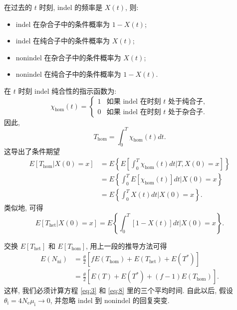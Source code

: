 \documentclass[12pt]{article}
\begin{document}
在过去的 $t$ 时刻, indel 的频率是 $X(t)$, 则:
\begin{itemize}[leftmargin=4em]
    \item indel 在杂合子中的条件概率为 $1-X(t)$;
    \item indel 在纯合子中的条件概率为 $X(t)$;
    \item nonindel 在杂合子中的条件概率为 $X(t)$;
    \item nonindel 在纯合子中的条件概率为 $1-X(t)$.
\end{itemize}
在 $t$ 时刻 indel 纯合性的指示函数为:
\begin{equation} \label{eq:4}
    \chi_\text{hom}(t) =
    {\begin{cases}
        1 & \text{如果 indel 在时刻~} t \text{~处于纯合子}, \\
        0 & \text{如果 indel 在时刻~} t \text{~处于杂合子}.
        \end{cases}}
\end{equation}
因此,
\begin{equation} \label{eq:5}
    T_\text{hom} = \int_{0}^{T} \chi_\text{hom}(t)dt \text{.}
\end{equation}
这导出了条件期望
\begin{equation} \label{eq:6}
    \begin{split}
        E[T_\text{hom} | X(0)=x]
        &= E \left\{ E\left[ \int_{0}^{T} \chi_\text{hom}(t) dt \mathrel{\Big|} T, X(0)=x  \right] \right\} \\
        &= E \left\{ \int_{0}^{T} E[\chi_\text{hom}(t)] dt \mathrel{\Big|} X(0)=x \right\} \\
        &= E \left\{ \int_{0}^{T} X(t) dt \mathrel{\Big|} X(0)=x \right\}
        \text{.}
    \end{split}
\end{equation}
类似地, 可得
\begin{equation} \label{eq:7}
    E[T_\text{het} | X(0)=x] = E \left\{ \int_{0}^{T} [1-X(t)] dt \mathrel{\Big|} X(0)=x \right\}
    \text{.}
\end{equation}

交换 $E[T_\text{het}]$ 和 $E[T_\text{hom}]$, 用上一段的推导方法可得
\begin{equation} \label{eq:8}
    \begin{split}
        E(N_\text{ni})
        &= \frac{\theta}{2} [f E(T_{\text{hom}}) + E(T_{\text{het}}) + E(T^*)] \\
        &= \frac{\theta}{2} [E(T) + E(T^*) + (f - 1) E(T_{\text{hom}})]
        \text{.}
    \end{split}
\end{equation}
这样, 我们必须计算方程 \ref{eq:3} 和 \ref{eq:8} 里的三个平均时间.
自此以后, 假设 $\theta_\text{i} = 4N_\text{e}\mu_\text{i} \rightarrow 0$,
并忽略 indel 到 nonindel 的回复突变.
\end{document}
